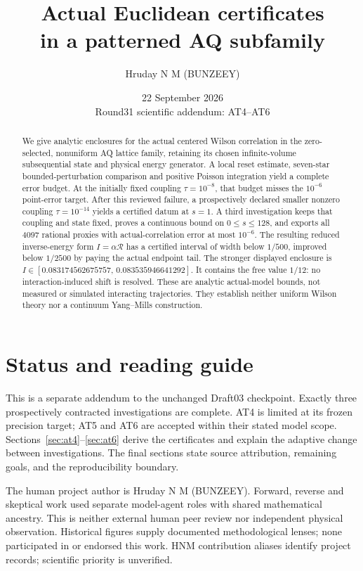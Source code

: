 \documentclass[11pt,a4paper]{article}
\title{Actual Euclidean certificates\\in a patterned AQ subfamily}
\author{Hruday N M (BUNZEEY)}
\date{22 September 2026\\\small Round31 scientific addendum: AT4--AT6}
\begin{document}
\maketitle
\begin{abstract}
We give analytic enclosures for the actual centered Wilson correlation in the
zero-selected, nonuniform AQ lattice family, retaining its chosen
infinite-volume subsequential state and physical energy generator. A local
reset estimate, seven-star bounded-perturbation comparison and positive
Poisson integration yield a complete error budget. At the initially fixed
coupling $\tau=10^{-8}$, that budget misses the $10^{-6}$ point-error target.
After this reviewed failure, a prospectively declared smaller nonzero coupling
$\tau=10^{-14}$ yields a certified datum at $s=1$. A third investigation keeps
that coupling and state fixed, proves a continuous bound on $0\le s\le128$,
and exports all 4097 rational proxies with actual-correlation error at most
$10^{-6}$. The resulting reduced inverse-energy form $I=\alpha\mathcal R$
has a certified interval of width below $1/500$, improved below $1/2500$ by
paying the actual endpoint tail. The stronger displayed enclosure is
$I\in[0.083174562675757,\,0.083535946641292]$.
It contains the free value $1/12$: no interaction-induced shift is resolved.
These are analytic actual-model bounds, not measured or simulated interacting
trajectories. They establish neither uniform Wilson theory nor a continuum
Yang--Mills construction.
\end{abstract}

\section*{Status and reading guide}
This is a separate addendum to the unchanged Draft03 checkpoint. Exactly three
prospectively contracted investigations are complete. AT4 is limited at its
frozen precision target; AT5 and AT6 are accepted within their stated model
scope. Sections~\ref{sec:at4}--\ref{sec:at6} derive the certificates and explain
the adaptive change between investigations. The final sections state source
attribution, remaining goals, and the reproducibility boundary.

The human project author is Hruday N M (BUNZEEY). Forward, reverse and skeptical
work used separate model-agent roles with shared mathematical ancestry. This
is neither external human peer review nor independent physical observation.
Historical figures supply documented methodological lenses; none participated
in or endorsed this work. HNM contribution aliases identify project records;
scientific priority is unverified.







\appendix


\end{document}
